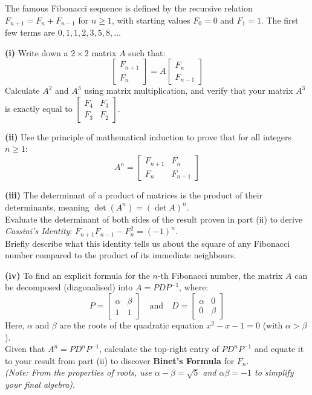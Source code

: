 \begin{problem}
The famous Fibonacci sequence is defined by the recursive relation $F_{n+1} = F_n + F_{n-1}$ for $n \ge 1$, with starting values $F_0 = 0$ and $F_1 = 1$. The first few terms are $0, 1, 1, 2, 3, 5, 8, \dots$

\textbf{(i)} Write down a $2 \times 2$ matrix $A$ such that:
\[
\begin{bmatrix} F_{n+1} \\ F_n \end{bmatrix} = A \begin{bmatrix} F_n \\ F_{n-1} \end{bmatrix}
\]
Calculate $A^2$ and $A^3$ using matrix multiplication, and verify that your matrix $A^3$ is exactly equal to $\begin{bmatrix} F_4 & F_3 \\ F_3 & F_2 \end{bmatrix}$.

\textbf{(ii)} Use the principle of mathematical induction to prove that for all integers $n \ge 1$:
\[
A^n = \begin{bmatrix} F_{n+1} & F_n \\ F_n & F_{n-1} \end{bmatrix}
\]

\textbf{(iii)} The determinant of a product of matrices is the product of their determinants, meaning $\det(A^n) = (\det A)^n$. \\
Evaluate the determinant of both sides of the result proven in part (ii) to derive \textit{Cassini's Identity}: $F_{n+1}F_{n-1} - F_n^2 = (-1)^n$. \\
Briefly describe what this identity tells us about the square of any Fibonacci number compared to the product of its immediate neighbours.

\textbf{(iv)} To find an explicit formula for the $n$-th Fibonacci number, the matrix $A$ can be decomposed (diagonalised) into $A = P D P^{-1}$, where:
\[
P = \begin{bmatrix} \alpha & \beta \\ 1 & 1 \end{bmatrix} \quad \text{and} \quad D = \begin{bmatrix} \alpha & 0 \\ 0 & \beta \end{bmatrix}
\]
Here, $\alpha$ and $\beta$ are the roots of the quadratic equation $x^2 - x - 1 = 0$ (with $\alpha > \beta$). \\
Given that $A^n = P D^n P^{-1}$, calculate the top-right entry of $P D^n P^{-1}$ and equate it to your result from part (ii) to discover \textbf{Binet's Formula} for $F_n$. \\
\textit{(Note: From the properties of roots, use $\alpha - \beta = \sqrt{5}$ and $\alpha\beta = -1$ to simplify your final algebra)}.
\end{problem}


